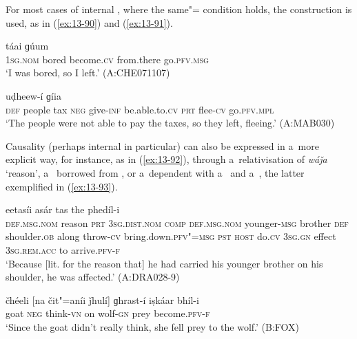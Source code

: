 For most cases of internal , where the same"= condition holds, the  construction is used, as in (\ref{ex:13-90}) and (\ref{ex:13-91}).

\begin{exe}
\ex
\label{ex:13-90}
 táai ɡúum  \\
\textsc{1sg.nom} bored become.\textsc{cv} from.there go.\textsc{pfv.msg}  \\
\glt `I was bored, so I left.' (A:CHE071107)

\ex
\label{ex:13-91}
 uḍheew-í ɡíia \\
 \textsc{def} people tax \textsc{neg} give-\textsc{inf} be.able.to.\textsc{cv} \textsc{prt}  flee-\textsc{cv}  go.\textsc{pfv.mpl}   \\
\glt `The people were not able to pay the taxes, so they left, fleeing.' (A:MAB030) 
\end{exe}

Causality (perhaps internal in particular) can also be expressed in a~more explicit way, for instance, as in (\ref{ex:13-92}), through a~relativisation of \textit{wáǰa} `reason', a~ borrowed from , or a~dependent  with a~ and a~, the latter exemplified in (\ref{ex:13-93}).

\begin{exe}
\ex
\label{ex:13-92}
 eetasíi asár tas the phedíl-i \\
\textsc{def.msg.nom} reason \textsc{prt} \textsc{3sg.dist.nom} \textsc{comp} \textsc{def.msg.nom} younger-\textsc{msg} brother \textsc{def}{\protect\footnotemark} shoulder.\textsc{ob} along throw-\textsc{cv} bring.down.\textsc{pfv"=msg} \textsc{pst} \textsc{host} do.\textsc{cv}  \textsc{3sg.gn} effect \textsc{3sg.rem.acc} to arrive.\textsc{pfv-f} \\
\glt `Because [lit. for the reason that] he had carried his younger brother on his shoulder, he was affected.' (A:DRA028-9)

\ex
\label{ex:13-93}
\gll čhéeli [na čit"=aníi ǰhulí] ɡhrast-í iṣkáar bhíl-i \\
goat \textsc{neg} think-\textsc{vn} on wolf-\textsc{gn} prey become.\textsc{pfv-f}  \\
\glt `Since the goat didn't really think, she fell prey to the wolf.' (B:FOX)
\end{exe}

